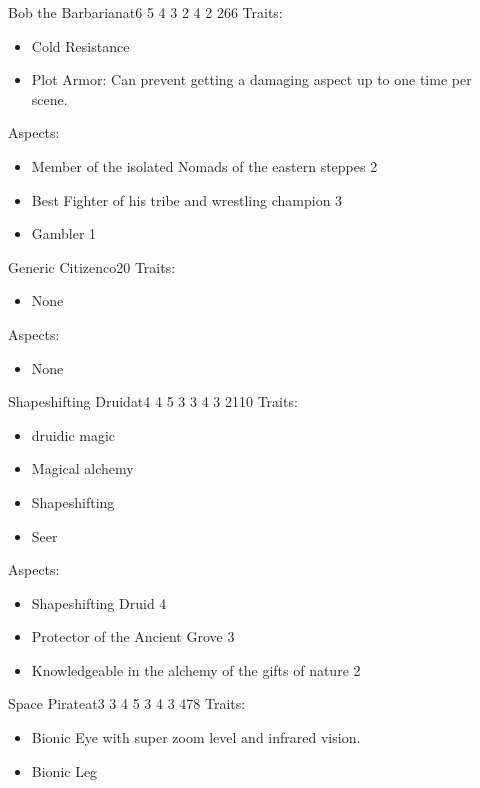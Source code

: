 \documentclass[11pt]{article}
\begin{document}
{\begin{npc}{Bob the Barbarian}{at}{6 5 4 3 2 4 2 2}{66}
Traits:
\begin{itemize}
\item Cold Resistance
\item Plot Armor: Can prevent getting a damaging aspect up to one time per scene.
\end{itemize}
\columnbreak

Aspects:
\begin{itemize}
\item Member of the isolated Nomads of the eastern steppes 2
\item Best Fighter of his tribe and wrestling champion 3
\item Gambler 1
\end{itemize}
\end{npc}

\begin{npc}{Generic Citizen}{co}{2}{0}
Traits:
\begin{itemize}
\item None
\end{itemize}

\columnbreak

Aspects:
\begin{itemize}
\item None
\end{itemize}
\end{npc}

\begin{npc}{Shapeshifting Druid}{at}{4 4 5 3 3 4 3 2}{110}
Traits:
\begin{itemize}
\item druidic magic
\item Magical alchemy
\item Shapeshifting
\item Seer
\end{itemize}

\columnbreak

Aspects:
\begin{itemize}
\item Shapeshifting Druid 4
\item Protector of the Ancient Grove 3
\item Knowledgeable in the alchemy of the gifts of nature 2
\end{itemize}
\end{npc}

\begin{npc}{Space Pirate}{at}{3 3 4 5 3 4 3 4}{78}
Traits:
\begin{itemize}
\item Bionic Eye with super zoom level and infrared vision.
\item Bionic Leg
\end{itemize}


\end{npc}}
\end{document}

